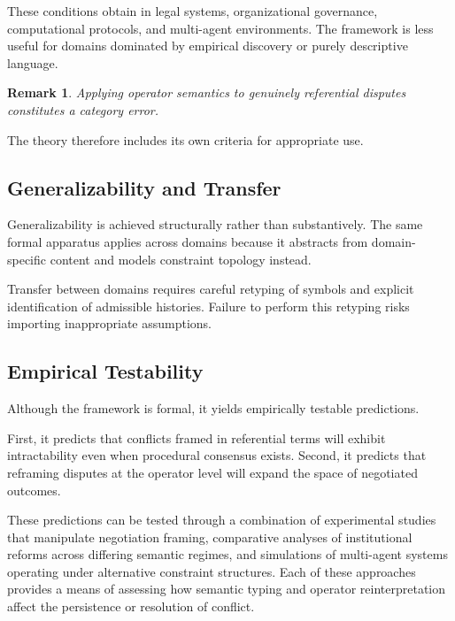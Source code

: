 \documentclass[11pt]{article}
\newtheorem{remark}{Remark}
\begin{document}
These conditions obtain in legal systems, organizational governance,
computational protocols, and multi-agent environments. The framework is less
useful for domains dominated by empirical discovery or purely descriptive
language.

\begin{remark}
Applying operator semantics to genuinely referential disputes constitutes a
category error.
\end{remark}

The theory therefore includes its own criteria for appropriate use.

\subsection{Generalizability and Transfer}

Generalizability is achieved structurally rather than substantively. The same
formal apparatus applies across domains because it abstracts from domain-specific
content and models constraint topology instead.

Transfer between domains requires careful retyping of symbols and explicit
identification of admissible histories. Failure to perform this retyping risks
importing inappropriate assumptions.

\subsection{Empirical Testability}

Although the framework is formal, it yields empirically testable predictions.

First, it predicts that conflicts framed in referential terms will exhibit
intractability even when procedural consensus exists. Second, it predicts that
reframing disputes at the operator level will expand the space of negotiated
outcomes.

These predictions can be tested through a combination of experimental studies
that manipulate negotiation framing, comparative analyses of institutional
reforms across differing semantic regimes, and simulations of multi-agent systems
operating under alternative constraint structures. Each of these approaches
provides a means of assessing how semantic typing and operator reinterpretation
affect the persistence or resolution of conflict.
\end{document}
